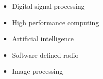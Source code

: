 \begin{itemize}
	\item Digital signal processing
	\item High performance computing
	\item Artificial intelligence
	\item Software defined radio
	\item Image processing
	      \\
\end{itemize}

